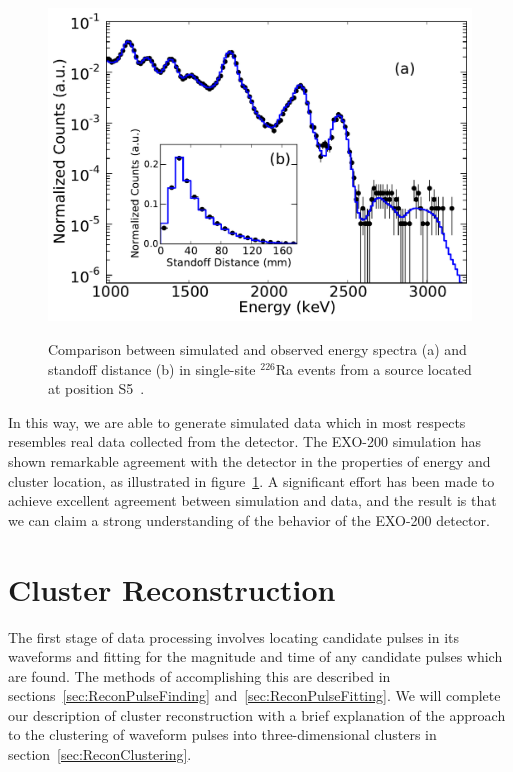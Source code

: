 \begin{figure}
\begin{center}
\includegraphics[keepaspectratio=true,width=\textwidth]{SS_Ra226_Campaign7.pdf}
\end{center}
\renewcommand{\baselinestretch}{1}
\small\normalsize
\begin{quote}
\caption{Comparison between simulated and observed energy spectra (a) and standoff distance (b) in single-site $^{226}$Ra events from a source located at position S5~\cite{NewEXObb0nPaper_2014}.}
\label{fig:RaSourceMCComparison}
\end{quote}
\end{figure}
\renewcommand{\baselinestretch}{2}
\small\normalsize

In this way, we are able to generate simulated data which in most respects resembles real data collected from the detector.  The EXO-200 simulation has shown remarkable agreement with the detector in the properties of energy and cluster location, as illustrated in figure~\ref{fig:RaSourceMCComparison}.  A significant effort has been made to achieve excellent agreement between simulation and data, and the result is that we can claim a strong understanding of the behavior of the EXO-200 detector.

\section{Cluster Reconstruction}\label{sec:ResultReconstruction}

The first stage of data processing involves locating candidate pulses in its waveforms and fitting for the magnitude and time of any candidate pulses which are found.  The methods of accomplishing this are described in sections~\ref{sec:ReconPulseFinding} and~\ref{sec:ReconPulseFitting}.  We will complete our description of cluster reconstruction with a brief explanation of the approach to the clustering of waveform pulses into three-dimensional clusters in section~\ref{sec:ReconClustering}.

